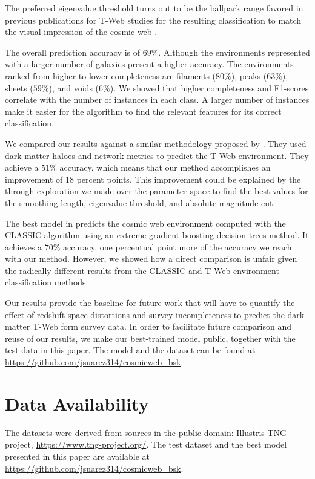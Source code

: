 \documentclass[usenatbib]{mnras}
\begin{document}
The preferred eigenvalue threshold turns out to be the ballpark range favored in previous publications for T-Web studies for the resulting classification to match the visual impression of the cosmic web \citep{Forero-Romero2009}.

The overall prediction accuracy is of $69\%$. Although the environments represented with a larger number of galaxies present a higher accuracy. The environments ranked from higher to lower completeness are filaments ($80\%$), peaks ($63\%$), sheets ($59\%$), and voids ($6\%$).
We showed that higher completeness and F1-scores correlate with the number of instances in each class. 
A larger number of instances make it easier for the algorithm to find the relevant features for its correct classification.

We compared our results against a similar methodology proposed by \cite{Tsizh2019}. They used dark matter haloes and network metrics to predict the T-Web environment.  They achieve a $51\%$ accuracy, which means that our method accomplishes an improvement of $18$ percent points.
This improvement could be explained by the through exploration we made over the parameter space to find the best values for
the smoothing length, eigenvalue threshold, and absolute magnitude cut.

The best model in \cite{Tsizh2019} predicts the cosmic web environment computed with the CLASSIC algorithm using an extreme gradient boosting decision trees method. 
It achieves a $70\%$ accuracy, one percentual point more of the accuracy we reach with our method. 
However, we showed how a direct comparison is unfair given the radically different results from the CLASSIC and T-Web environment classification methods.

Our results provide the baseline for future work that will have to quantify the effect of redshift space distortions and survey incompleteness to predict the dark matter T-Web form survey data.
In order to facilitate future comparison and reuse of our results, we make our best-trained model public, together with the test data in this paper.
The model and the dataset can be found at \url{https://github.com/jsuarez314/cosmicweb_bsk}.

\section*{Data Availability}
The datasets were derived from sources in the public domain: Illustris-TNG project, \url{https://www.tng-project.org/}.
The test dataset and the best model presented in this paper are available at \url{https://github.com/jsuarez314/cosmicweb_bsk}.
\end{document}
